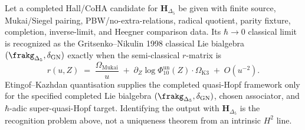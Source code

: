 \begin{theorem}
\label{thm:dl-kazhdan-classical-limit}
\ClaimStatusConditional
{}
Let a completed Hall/CoHA candidate for $\mathbf H_{\Delta_5}$ be given
with finite source, Mukai/Siegel pairing, PBW/no-extra-relations,
radical quotient, parity fixture, completion, inverse-limit, and
Heegner comparison data. Its $\hbar\to 0$ classical limit is recognized
as the Gritsenko--Nikulin 1998 classical Lie bialgebra
$(\frakg_{\Delta_5}, \delta_{\mathrm{GN}})$ exactly when the
semi-classical $r$-matrix is
\begin{equation}
\label{eq:dl-classical-limit}
 r(u, Z)
 \;=\;
 \frac{\Omega_{\mathrm{Mukai}}}{u}
 \;+\;
 \partial_Z\log\Phi_{10}^{\mathrm{un}}(Z)\cdot\Omega_{\mathrm{K3}}
 \;+\;
 O(u^{-2}).
\end{equation}
Etingof--Kazhdan quantisation supplies the completed quasi-Hopf
framework only for the specified completed Lie bialgebra
\((\frakg_{\Delta_5},\delta_{\mathrm{GN}})\), chosen associator,
and \(\hbar\)-adic super-quasi-Hopf target. Identifying the output
with $\mathbf H_{\Delta_5}$ is the recognition problem above, not a
uniqueness theorem from an intrinsic $H^2$ line.
\end{theorem}

